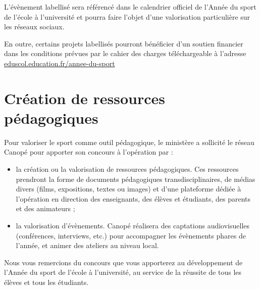 L’évènement labellisé sera référencé dans le calendrier officiel de l’Année du sport de l’école à l’université et pourra faire l’objet d’une valorisation particulière sur les réseaux sociaux.

En outre, certains projets labellisés pourront bénéficier d’un soutien financier dans les conditions prévues par le cahier des charges téléchargeable à l’adresse \href{http://www.eduscol.education.fr/annee-du-sport}{eduscol.education.fr/annee-du-sport}

\section{Création de ressources pédagogiques}
Pour valoriser le sport comme outil pédagogique, le ministère a sollicité le réseau Canopé pour apporter son concours à l’opération par :
\begin{itemize}
\item la création ou la valorisation de ressources pédagogiques. Ces ressources prendront la forme de documents pédagogiques transdisciplinaires, de médias divers (films, expositions, textes ou images) et d’une plateforme dédiée à l’opération en direction des enseignants, des élèves et étudiants, des parents et des animateurs ;
\item la valorisation d’évènements. Canopé réalisera des captations audiovisuelles (conférences, interviews, etc.) pour accompagner les évènements phares de l’année, et animer des ateliers au niveau local.
\end{itemize}

Nous vous remercions du concours que vous apporterez au développement de l’Année du sport de l’école à l’université, au service de la réussite de tous les élèves et tous les étudiants.